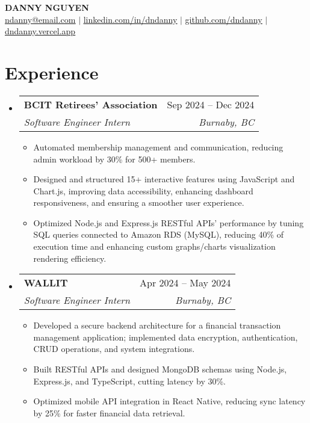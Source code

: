 \documentclass[letterpaper,11pt]{article}
\makeatletter
\newcommand{\resumeItem}[1]{
\item\small{
{#1 \vspace{-2pt}}
}
}
\newcommand{\resumeSubheading}[4]{
\vspace{-2pt}\item
\begin{tabular*}{0.97\textwidth}[t]{l@{\extracolsep{\fill}}r}
\textbf{#1} & #2 \\
\textit{\small#3} & \textit{\small #4} \\
\end{tabular*}\vspace{-7pt}
}
\newcommand{\resumeSubHeadingListStart}{\begin{itemize}[leftmargin=0.15in, label={}]}
\newcommand{\resumeSubHeadingListEnd}{\end{itemize}}
\newcommand{\resumeItemListStart}{\begin{itemize}}
\newcommand{\resumeItemListEnd}{\end{itemize}\vspace{-5pt}}
\makeatother
\begin{document}
\begin{center}
\textbf{\Huge \scshape DANNY NGUYEN} \\ \vspace{1pt}
\small \href{mailto:ndanny@email.com}{\underline{ndanny@email.com}} $|$
\href{https://linkedin.com/in/dndanny}{\underline{linkedin.com/in/dndanny}} $|$
\href{https://github.com/dndanny}{\underline{github.com/dndanny}} $|$
\href{https://dndanny.vercel.app}{\underline{dndanny.vercel.app}}
\end{center}


\section{Experience}
\resumeSubHeadingListStart
\resumeSubheading{BCIT Retirees’ Association}{Sep 2024 – Dec 2024}{Software Engineer Intern}{Burnaby, BC}
\resumeItemListStart
\resumeItem{Automated membership management and communication, reducing admin workload by 30\% for 500+ members.}
\resumeItem{Designed and structured 15+ interactive features using JavaScript and Chart.js, improving data accessibility, enhancing dashboard responsiveness, and ensuring a smoother user experience.}
\resumeItem{Optimized Node.js and Express.js RESTful APIs’ performance by tuning SQL queries connected to Amazon RDS (MySQL), reducing 40\% of execution time and enhancing custom graphs/charts visualization rendering efficiency.}
\resumeItemListEnd
\resumeSubheading{WALLIT}{Apr 2024 – May 2024}{Software Engineer Intern}{Burnaby, BC}
\resumeItemListStart
\resumeItem{Developed a secure backend architecture for a financial transaction management application; implemented data encryption, authentication, CRUD operations, and system integrations.}
\resumeItem{Built RESTful APIs and designed MongoDB schemas using Node.js, Express.js, and TypeScript, cutting latency by 30\%.}
\resumeItem{Optimized mobile API integration in React Native, reducing sync latency by 25\% for faster financial data retrieval.}
\resumeItemListEnd
\resumeSubHeadingListEnd
\end{document}
